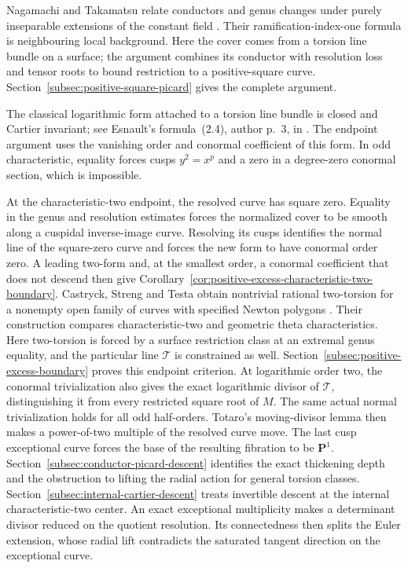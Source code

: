 \documentclass[11pt]{article}
\theoremstyle{remark}\newtheorem{remark}[theorem]{Remark}
\newcommand{\PP}{\mathbf P}
\begin{document}
Nagamachi and Takamatsu relate conductors and genus changes under
purely inseparable extensions of the constant field
\cite[Theorem~0.2 and discussion, pp.~2--3]{NagamachiTakamatsu}.
Their ramification-index-one formula is neighbouring local background.
Here the cover comes from a torsion line bundle on a surface;
the argument combines its conductor with resolution loss and tensor
roots to bound restriction to a positive-square curve.
Section~\ref{subsec:positive-square-picard} gives the complete argument.

The classical logarithmic form attached to a torsion line bundle
is closed and Cartier invariant; see Esnault's formula~(2.4),
author p.~3, in \cite{EsnaultPartialConnection}.
The endpoint argument uses the vanishing order and conormal
coefficient of this form. In odd characteristic, equality forces
cusps $y^2=x^p$ and a zero in a degree-zero conormal section,
which is impossible.

At the characteristic-two endpoint, the resolved curve has square
zero. Equality in the genus and resolution estimates forces the
normalized cover to be smooth along a cuspidal inverse-image curve.
Resolving its cusps identifies the normal line of the square-zero
curve and forces the new form to have conormal order zero.
A leading two-form and, at the smallest order, a conormal
coefficient that does not descend then give
Corollary~\ref{cor:positive-excess-characteristic-two-boundary}.
Castryck, Streng and Testa obtain nontrivial rational two-torsion
for a nonempty open family of curves with specified Newton polygons
\cite[Theorem~2, author p.~2; introduction, pp.~1--3]{CastryckStrengTesta}.
Their construction compares characteristic-two and geometric
theta characteristics. Here two-torsion is forced by a surface
restriction class at an extremal genus equality, and the particular
line $\mathcal T$ is constrained as well.
Section~\ref{subsec:positive-excess-boundary} proves this endpoint
criterion. At logarithmic order two, the conormal trivialization
also gives the exact logarithmic divisor of $\mathcal T$, distinguishing
it from every restricted square root of $M$.
The same actual normal trivialization holds for all odd half-orders.
Totaro's moving-divisor lemma \cite[Lemma~4.1, pp.~7--8]{TotaroMovingDivisors}
then makes a power-of-two multiple of the resolved curve move.
The last cusp exceptional curve forces the base of the resulting
fibration to be $\PP^1$.
Section~\ref{subsec:conductor-picard-descent}
identifies the exact thickening depth and the obstruction to
lifting the radial action for general torsion classes.
Section~\ref{subsec:internal-cartier-descent} treats invertible
descent at the internal characteristic-two center. An exact
exceptional multiplicity makes a determinant divisor reduced on
the quotient resolution. Its connectedness then splits the Euler
extension, whose radial lift contradicts the saturated tangent
direction on the exceptional curve.
\end{document}

